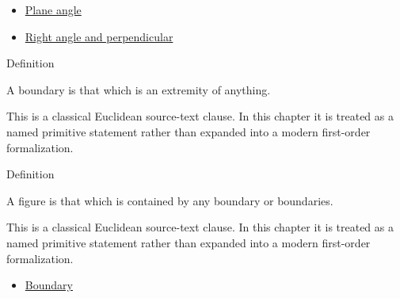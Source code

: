 \begin{lra-not-visible}
\begin{dependencies}
\begin{itemize}
  \item \hyperref[def:euclid-plane-angle]{Plane angle}
  \item \hyperref[def:euclid-right-angle-and-perpendicular]{Right angle and perpendicular}
\end{itemize}
\end{dependencies}
\end{lra-not-visible}

\begin{definitionbox}{Definition}
\begin{definition}[Boundary]
\label{def:euclid-boundary}
A boundary is that which is an extremity of anything.
\end{definition}
\end{definitionbox}
\begin{remark*}
This is a classical Euclidean source-text clause. In this chapter it is treated
as a named primitive statement rather than expanded into a modern first-order
formalization.
\end{remark*}

\begin{lra-not-visible}
\NoLocalDependencies
\end{lra-not-visible}

\begin{definitionbox}{Definition}
\begin{definition}[Figure]
\label{def:euclid-figure}
A figure is that which is contained by any boundary or boundaries.
\end{definition}
\end{definitionbox}
\begin{remark*}
This is a classical Euclidean source-text clause. In this chapter it is treated
as a named primitive statement rather than expanded into a modern first-order
formalization.
\end{remark*}

\begin{lra-not-visible}
\begin{dependencies}
\begin{itemize}
  \item \hyperref[def:euclid-boundary]{Boundary}
\end{itemize}
\end{dependencies}
\end{lra-not-visible}

